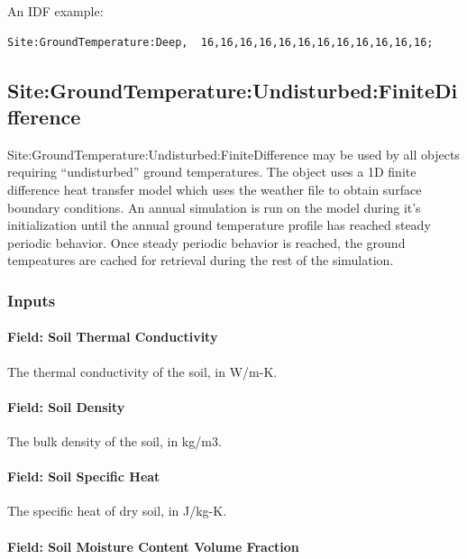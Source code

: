An IDF example:

\begin{lstlisting}
Site:GroundTemperature:Deep,  16,16,16,16,16,16,16,16,16,16,16,16;
\end{lstlisting}

\subsection{Site:GroundTemperature:Undisturbed:FiniteDifference}\label{sitegroundtemperatureundisturbedfinitedifference}

Site:GroundTemperature:Undisturbed:FiniteDifference may be used by all objects requiring ``undisturbed'' ground temperatures. The object uses a 1D finite difference heat transfer model which uses the weather file to obtain surface boundary conditions. An annual simulation is run on the model during it's initialization until the annual ground temperature profile has reached steady periodic behavior. Once steady periodic behavior is reached, the ground tempeatures are cached for retrieval during the rest of the simulation.

\subsubsection{Inputs}\label{inputs-14-007}

\paragraph{Field: Soil Thermal Conductivity}\label{field-soil-thermal-conductivity-000}

The thermal conductivity of the soil, in W/m-K.

\paragraph{Field: Soil Density}\label{field-soil-density-000}

The bulk density of the soil, in kg/m3.

\paragraph{Field: Soil Specific Heat}\label{field-soil-specific-heat-000}

The specific heat of dry soil, in J/kg-K.

\paragraph{Field: Soil Moisture Content Volume Fraction}\label{field-soil-moisture-content-volume-fraction}

